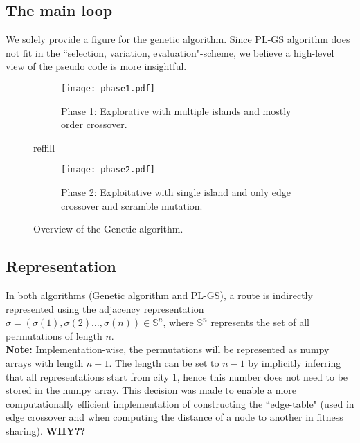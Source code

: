 \documentclass[a4paper,10pt]{article}
\newcommand{\ReplaceMe}[1]{{\color{blue}#1}}
\begin{document}
	


\subsection{The main loop}
	We solely provide a figure for the genetic algorithm. Since  PL-GS algorithm does not fit in the ``selection, variation, evaluation"-scheme, we believe a high-level view of the pseudo code is more insightful.
	
	\begin{figure}[h]
		\centering
		\begin{subfigure}{0.45\textwidth}
			\texttt{[image: phase1.pdf]}
			\caption{Phase 1: Explorative with multiple islands and mostly order crossover.}
			\label{fig:croppedfile1}
		\end{subfigure}
		reffill
		\begin{subfigure}{0.45\textwidth}
			\texttt{[image: phase2.pdf]}
			\caption{Phase 2: Exploitative with single island and only edge crossover and scramble mutation.}
			\label{fig:croppedfile2}
		\end{subfigure}
		\caption{Overview of the Genetic algorithm.}
		\label{fig:comparison}
	\end{figure}

	

\subsection{Representation}\label{sec_rep}
	
	In both algorithms (Genetic algorithm and PL-GS), a route is indirectly represented using the adjacency representation $\sigma = \left( \sigma(1), \sigma(2) \dots, \sigma(n) \right) \in \mathbb{S}^n$, where $\mathbb{S}^n$ represents the set of all permutations of length $n$.\\
	\textbf{Note:} Implementation-wise, the permutations will be represented as numpy arrays with length $n-1$. The length can be set to $n-1$ by implicitly inferring that all representations start from city 1, hence this number does not need to be stored in the numpy array. This decision was made to enable a more computationally efficient implementation of constructing the ``edge-table" (used in edge crossover and when computing the distance of a node to another in fitness sharing). \textbf{WHY??}
	
\end{document}
